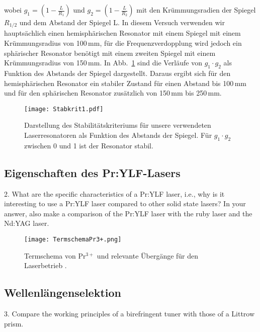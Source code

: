 wobei $g_1=(1-\frac{L}{R_1})$ und $g_2=(1-\frac{L}{R_2})$ mit den Krümmungsradien der Spiegel
$R_{1/2}$ und dem Abstand der Spiegel L. In diesem Versuch verwenden wir hauptsächlich einen
hemisphärischen Resonator mit einem Spiegel mit einem Krümmungsradius von 100\,mm, für die
Frequenzverdopplung wird jedoch ein sphärischer Resonator benötigt mit einem zweiten Spiegel mit
einem Krümmungsradius von 150\,mm.
In Abb.~\ref{img:stabkrit} sind die Verläufe von $g_1 \cdot g_2$ als Funktion des Abstands der
Spiegel dargestellt. Daraus ergibt sich für den hemisphärischen Resonator ein stabiler Zustand für
einen Abstand bis 100\,mm und für den sphärischen Resonator zusätzlich von 150\,mm bis 250\,mm.

\begin{figure}[H]
\begin{center}
  \texttt{[image: Stabkrit1.pdf]}
  \caption{Darstellung des Stabilitätskriteriums für unsere verwendeten Laserresonatoren als
  Funktion des Abstands der Spiegel. Für $g_1\cdot g_2$ zwischen 0 und 1 ist der Resonator stabil.}
  \label{img:stabkrit}
\end{center}
\end{figure}


\subsection{Eigenschaften des Pr:YLF-Lasers}

2. What are the specific characteristics of a Pr:YLF laser, i.e., why is it interesting to use a Pr:YLF
laser compared to other solid state lasers? In your answer, also make a comparison of the Pr:YLF
laser with the ruby laser and the Nd:YAG laser.

\begin{figure}[H]
\begin{center}
  \texttt{[image: TermschemaPr3+.png]}
  \caption{Termschema von Pr$^{3+}$ und relevante Übergänge für den Laserbetrieb
  \cite{Versuchsanleitung}.}
  \label{img:Termschema}
\end{center}
\end{figure}

\subsection{Wellenlängenselektion}


3. Compare the working principles of a birefringent tuner with those of a Littrow prism.


